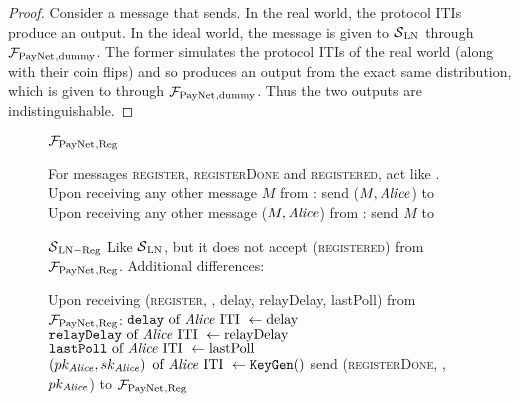   \begin{proof}
    Consider a message that \environment{} sends. In the real world, the
    protocol ITIs produce an output. In the ideal world, the message is given to
    $\mathcal{S}{}_{\mathrm{LN}}$ through $\mathcal{F}_{\mathrm{PayNet}}{}_{\mathrm{, dummy}}$. The
    former simulates the protocol ITIs of the real world (along with their coin
    flips) and so produces an output from the exact same distribution, which is
    given to \environment{} through $\mathcal{F}_{\mathrm{PayNet}}{}_{\mathrm{, dummy}}$. Thus the
    two outputs are indistinguishable.
  \end{proof}

  \begin{figure}[H]
    \begin{systembox}{$\mathcal{F}_{\mathrm{PayNet}}{}_{\mathrm{, Reg}}$}
      \begin{algorithmic}[1]
        \State For messages \textsc{register}, \textsc{registerDone} and
        \textsc{registered}, act like \fpaynet{}.
        \State Upon receiving any other message $M$ from \alice:
        \Indent
            \State send ($M, \mathit{Alice}$) to \simulator
          \EndIf
        \EndIndent
        \State Upon receiving any other message ($M, \mathit{Alice}$) from \simulator:
        \Indent
            \State send $M$ to \alice
          \EndIf
        \EndIndent
      \end{algorithmic}
    \end{systembox}
    \caption{}
    \label{alg:fpaynet:reg}
  \end{figure}

  \begin{figure}[H]
    \begin{simulatorbox}{$\mathcal{S}{}_{\mathrm{LN - Reg}}$}
      Like $\mathcal{S}{}_{\mathrm{LN}}$, but it does not accept
      (\textsc{registered}) from $\mathcal{F}_{\mathrm{PayNet}}{}_{\mathrm{, Reg}}$.
      Additional differences:
      \begin{algorithmic}[1]
        \State Upon receiving (\textsc{register}, \alice, delay, relayDelay,
        lastPoll) from $\mathcal{F}_{\mathrm{PayNet}}{}_{\mathrm{, Reg}}$:
        \Indent
          \State $\mathtt{delay} \text{ of \ensuremath{\mathit{Alice}}{} ITI } \gets \mathrm{delay}$
          \label{alg:sim:reg:delay}
          \State $\mathtt{relayDelay} \text{ of \ensuremath{\mathit{Alice}}{} ITI } \gets
          \mathrm{relayDelay}$
          \State $\mathtt{lastPoll} \text{ of \ensuremath{\mathit{Alice}}{} ITI } \gets
          \mathrm{lastPoll}$
          \State $\left(pk_{\mathit{Alice}}, sk_{\mathit{Alice}}\right) \text{ of \ensuremath{\mathit{Alice}}{} ITI }
          \gets \mathtt{KeyGen}()$
          \label{alg:sim:reg:keygen}
          \State send (\textsc{registerDone}, \alice, $pk_{\mathit{Alice}}$) to
          $\mathcal{F}_{\mathrm{PayNet}}{}_{\mathrm{, Reg}}$
        \EndIndent
      \end{algorithmic}
    \end{simulatorbox}
    \caption{}
    \label{alg:sim:reg}
  \end{figure}

